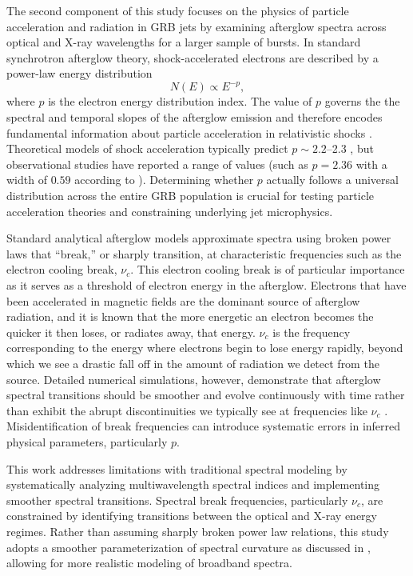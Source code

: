 \documentclass{article}
\begin{document}
The second component of this study focuses on the physics of particle acceleration and radiation in GRB jets by examining afterglow spectra across optical and X-ray wavelengths for a larger sample of bursts. In standard synchrotron afterglow theory, shock-accelerated electrons are described by a power-law energy distribution
\[
N(E) \propto E^{-p},
\]
where $p$ is the electron energy distribution index. The value of $p$ governs the the spectral and temporal slopes of the afterglow emission and therefore encodes fundamental information about particle acceleration in relativistic shocks \parencite{fireball}. Theoretical models of shock acceleration typically predict $p \sim 2.2$--2.3 \parencite{pvalues}, but observational studies have reported a range of values (such as $p=2.36$ with a width of $0.59$ according to \cite{other_pvalues}). Determining whether $p$ actually follows a universal distribution across the entire GRB population is crucial for testing particle acceleration theories and constraining underlying jet microphysics.

Standard analytical afterglow models approximate spectra using broken power laws that ``break,'' or sharply transition, at characteristic frequencies such as the electron cooling break, $\nu_c$. This electron cooling break is of particular importance as it serves as a threshold of electron energy in the afterglow. Electrons that have been accelerated in magnetic fields are the dominant source of afterglow radiation, and it is known that the more energetic an electron becomes the quicker it then loses, or radiates away, that energy. $\nu_c$ is the frequency corresponding to the energy where electrons begin to lose energy rapidly, beyond which we see a drastic fall off in the amount of radiation we detect from the source. Detailed numerical simulations, however, demonstrate that afterglow spectral transitions should be smoother and evolve continuously with time rather than exhibit the abrupt discontinuities we typically see at frequencies like $\nu_c$ \parencite{breaks}. Misidentification of break frequencies can introduce systematic errors in inferred physical parameters, particularly $p$.

This work addresses limitations with traditional spectral modeling by systematically analyzing multiwavelength spectral indices and implementing smoother spectral transitions. Spectral break frequencies, particularly $\nu_c$, are constrained by identifying transitions between the optical and X-ray energy regimes. Rather than assuming sharply broken power law relations, this study adopts a smoother parameterization of spectral curvature as discussed in \cite{breaks}, allowing for more realistic modeling of broadband spectra.
\end{document}
